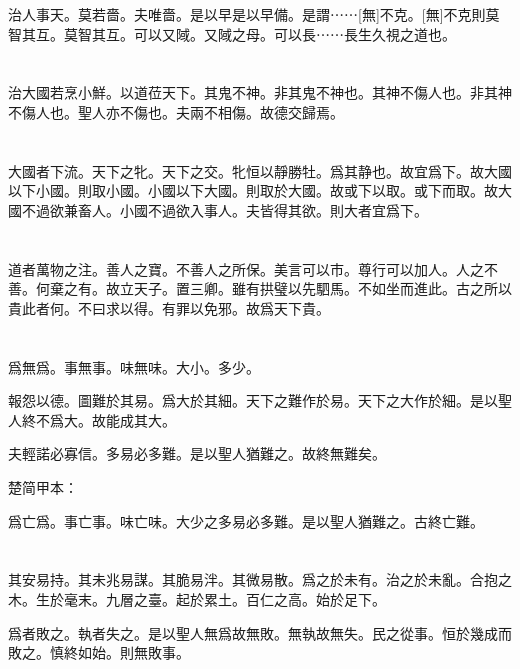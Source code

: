 \documentclass[a5paper]{ctexbook}
\begin{document}
    治人事天。莫若嗇。夫唯嗇。是以早是以早備。是謂⋯⋯[無]不克。[無]不克則莫智其互。莫智其互。可以又䧕。又䧕之母。可以長⋯⋯長生久視之道也。

    \chapter{}

    治大國若烹小鮮。以道莅天下。其鬼不神。非其鬼不神也。其神不傷人也。非其神不傷人也。聖人亦不傷也。夫兩不相傷。故德交歸焉。

    \chapter{}

    大國者下流。天下之牝。天下之交。牝恒以靜勝牡。爲其静也。故宜爲下。故大國以下小國。則取小國。小國以下大國。則取於大國。故或下以取。或下而取。故大國不過欲兼畜人。小國不過欲入事人。夫皆得其欲。則大者宜爲下。

    \chapter{}

    道者萬物之注。善人之寶。不善人之所保。美言可以市。尊行可以加人。人之不善。何棄之有。故立天子。置三卿。雖有拱璧以先駟馬。不如坐而進此。古之所以貴此者何。不曰求以得。有罪以免邪。故爲天下貴。

    \chapter{}

    爲無爲。事無事。味無味。大小。多少。
    
    報怨以德。圖難於其易。爲大於其細。天下之難作於易。天下之大作於細。是以聖人終不爲大。故能成其大。

    夫輕諾必寡信。多易必多難。是以聖人猶難之。故終無難矣。

    楚简甲本：

    爲亡爲。事亡事。味亡味。大少之多易必多難。是以聖人猶難之。古終亡難。

    \chapter{}

    其安易持。其未兆易謀。其脆易泮。其微易散。爲之於未有。治之於未亂。合抱之木。生於毫末。九層之臺。起於累土。百仁之高。始於足下。

    爲者敗之。執者失之。是以聖人無爲故無敗。無執故無失。民之從事。恒於幾成而敗之。慎終如始。則無敗事。
\end{document}
